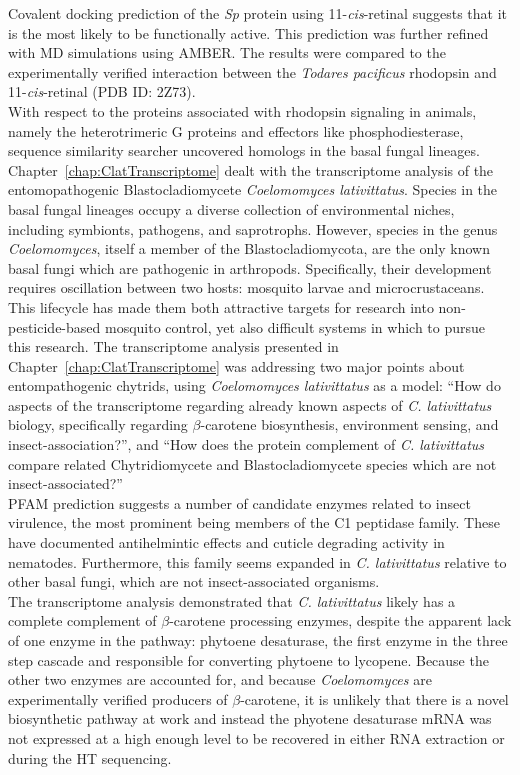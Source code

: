 \indent Covalent docking prediction of the \textit{Sp} protein using 11-\textit{cis}-retinal suggests that it is the most likely to be functionally active. This prediction was further refined with MD simulations using AMBER. The results were compared to the experimentally verified interaction between the \textit{Todares pacificus} rhodopsin and 11-\textit{cis}-retinal (PDB ID: 2Z73). \\
\indent With respect to the proteins associated with rhodopsin signaling in animals, namely the heterotrimeric G proteins and effectors like phosphodiesterase, sequence similarity searcher uncovered homologs in the basal fungal lineages. \\

\indent Chapter~\ref{chap:ClatTranscriptome} dealt with the transcriptome analysis of the entomopathogenic Blastocladiomycete \textit{Coelomomyces lativittatus}. Species in the basal fungal lineages occupy a diverse collection of environmental niches, including symbionts, pathogens, and saprotrophs. However, species in the genus \textit{Coelomomyces}, itself a member of the Blastocladiomycota, are the only known basal fungi which are pathogenic in arthropods. Specifically, their development requires oscillation between two hosts: mosquito larvae and microcrustaceans. This lifecycle has made them both attractive targets for research into non-pesticide-based mosquito control, yet also difficult systems in which to pursue this research. The transcriptome analysis presented in Chapter~\ref{chap:ClatTranscriptome} was addressing two major points about entompathogenic chytrids, using \textit{Coelomomyces lativittatus} as a model: \enquote{How do aspects of the transcriptome regarding already known aspects of \textit{C. lativittatus} biology, specifically regarding $\beta$-carotene biosynthesis, environment sensing, and insect-association?}, and \enquote{How does the protein complement of \textit{C. lativittatus} compare related Chytridiomycete and Blastocladiomycete species which are not insect-associated?}\\
\indent PFAM prediction suggests a number of candidate enzymes related to insect virulence, the most prominent being members of the C1 peptidase family. These have documented antihelmintic effects and cuticle degrading activity in nematodes. Furthermore, this family seems expanded in \textit{C. lativittatus} relative to other basal fungi, which are not insect-associated organisms.\\
\indent The transcriptome analysis demonstrated that \textit{C. lativittatus} likely has a complete complement of $\beta$-carotene processing enzymes, despite the apparent lack of one enzyme in the pathway: phytoene desaturase, the first enzyme in the three step cascade and responsible for converting phytoene to lycopene. Because the other two enzymes are accounted for, and because \textit{Coelomomyces} are experimentally verified producers of $\beta$-carotene, it is unlikely that there is a novel biosynthetic pathway at work and instead the phyotene desaturase mRNA was not expressed at a high enough level to be recovered in either RNA extraction or during the HT sequencing.\\ 
